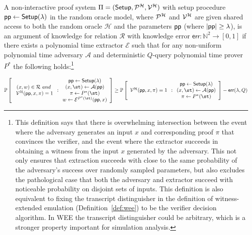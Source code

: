 \begin{definition}\label{def:ROargument}
	A non-interactive proof system $\Pi = (\textsf{{Setup}}, \mathcal{P}^\mathcal{H}, \mathcal{V}^\mathcal{H})$ with setup procedure $\textsf{pp} \gets \textsf{{Setup}}(\lambda)$ in the random oracle model, where $\mathcal{P}^\mathcal{H}$ and $\mathcal{V}^\mathcal{H}$ are given shared access to both the random oracle $\mathcal{H}$ and the parameters $\textsf{pp}$ (where $|\textsf{pp}| \geq \lambda$), is an argument of knowledge for relation $\mathcal{R}$ with knowledge error $\textsf{err}: \mathbb{N}^2 \rightarrow [0,1]$ if there exists a polynomial time extractor $\mathcal{E}$ such that for any non-uniform polynomial time adversary $\mathcal{A}$ and deterministic $Q$-query polynomial time prover $P^*$ the following holds:\footnote{This definition says that there is overwhelming intersection between the event where the adversary generates an input $x$ and corresponding proof $\pi$ that convinces the verifier, and the event where the extractor succeeds in obtaining a witness from the input $x$ generated by the adversary. This not only ensures that extraction succeeds with close to the same probability of the adversary's success over randomly sampled parameters, but also excludes the pathological case that both the adversary and extractor succeed with noticeable probability on disjoint sets of inputs. This definition is also equivalent to fixing the transcript distinguisher in the definition of witness-extended emulation (Definition~\ref{def:wee}) to be the verifier decision algorithm. In WEE the transcript distinguisher could be arbitrary, which is a stronger property important for simulation analysis.}
	\begin{small}
	\[ 
	\mathbb{P} \left[
	\begin{array}{c} 
	(x,w) \in \mathcal{R} \ and \\\ 
    \verifier^\mathcal{H}(\crs, x, \pi) = 1 
	\end{array} : 
	\begin{array}{c}
	\crs \gets \setup(\lambda) \\
	(x, \st) \gets \mathcal{A}(\crs) \\ 
	\pi \gets P^*(\st) \\ 
	w \gets \mathcal{E}^{P^*(\st)}(\crs, x) 
	\end{array}
 \right] \geq \mathbb{P} \left[
	\begin{array}{c} 
	\verifier^\mathcal{H}(\crs, x, \pi) = 1 
	\end{array} : 
	\begin{array}{c}
	\crs \gets \setup(\lambda) \\
	(x, \st) \gets \mathcal{A}(\crs) \\ 
	\pi \gets P^*(\st) \\ 
	\end{array}
 \right] -  \textsf{err}(\lambda, Q)
	\]
	\end{small}
\end{definition}



